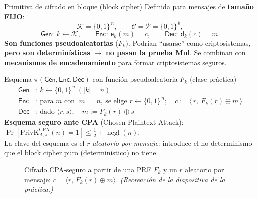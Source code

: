 \documentclass[11pt,a4paper]{article}
\newcommand{\Kset}{\mathcal{K}}
\newcommand{\Cset}{\mathcal{C}}
\newcommand{\Pset}{\mathcal{P}}
\newcommand{\xor}{\oplus}
\newcommand{\Enc}{\mathsf{Enc}}
\newcommand{\Dec}{\mathsf{Dec}}
\newcommand{\Gen}{\mathsf{Gen}}
\DeclareMathOperator{\negl}{negl}
\newcommand{\E}{\mathsf{e}}
\newcommand{\D}{\mathsf{d}}
\newcommand{\bits}{\{0,1\}}
\begin{document}
\begin{defbox}{Primitiva de cifrado en bloque (block cipher)}
Definida para mensajes de \textbf{tamaño FIJO}:
\[
  \Kset=\bits^{\,n},\qquad \Cset=\Pset=\bits^{\,b},
\]
\[
  \Gen:\ k\leftarrow\Kset,\qquad \Enc:\ \E_k(m)=c,\qquad \Dec:\ \D_k(c)=m.
\]
\textbf{Son funciones pseudoaleatorias} ($F_k$). Podrían ``usarse'' como criptosistemas,
\textbf{pero son determinísticas} $\to$ \textbf{no pasan la prueba Mul}. Se combinan con
\textbf{mecanismos de encadenamiento} para formar criptosistemas seguros.
\end{defbox}

\begin{practbox}{Esquema $\pi(\Gen,\Enc,\Dec)$ con función pseudoaleatoria $F_k$
(clase práctica)}
\[
\begin{aligned}
  \Gen &:\ k\leftarrow\bits^{\,n}\ (|k|=n)\\
  \Enc &:\ \text{para } m \text{ con }|m|=n,\ \text{se elige } r\leftarrow\bits^{\,n};
        \quad c:=\langle\, r,\ F_k(r)\xor m\,\rangle\\
  \Dec &:\ \text{dado } \langle r,s\rangle,\quad m:=F_k(r)\xor s
\end{aligned}
\]
\textbf{Esquema seguro ante CPA} (Chosen Plaintext Attack):
$\Pr[\mathrm{PrivK}^{\mathrm{CPA}}_{A,\pi}(n)=1]\le\tfrac12+\negl(n)$.\\[4pt]
La clave del esquema es el $r$ \emph{aleatorio por mensaje}: introduce el no determinismo
que el block cipher puro (determinístico) no tiene.
\end{practbox}

\begin{figure}[h]
\centering
{}
\caption{Cifrado CPA-seguro a partir de una PRF $F_k$ y un $r$ aleatorio por mensaje:
$c=\langle r,\,F_k(r)\xor m\rangle$. \textit{(Recreación de la diapositiva de la
práctica.)}}
\end{figure}
\end{document}
